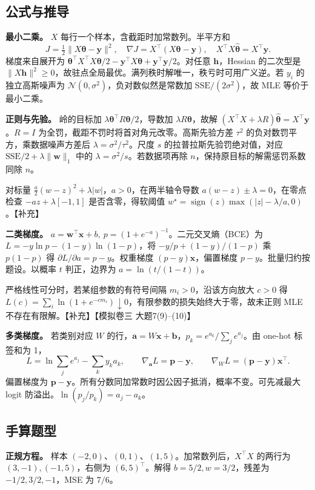 \documentclass[UTF8,a4paper,zihao=-4,fontset=fandol]{ctexart}
\begin{document}
\subsection{公式与推导}
\textbf{最小二乘。} \(X\) 每行一个样本，含截距时加常数列。半平方和
\[
 J=\tfrac12\|X\bm\theta-\bm y\|^2,\quad
 \nabla J=X^\top(X\bm\theta-\bm y),\quad X^\top X\widehat{\bm\theta}=X^\top\bm y .
\]
梯度来自展开为 \(\bm\theta^\top X^\top X\bm\theta/2-\bm y^\top X\bm\theta+\bm y^\top\bm y/2\)。对任意 \(\bm h\)，Hessian 的二次型是 \(\|X\bm h\|^2\ge0\)，故驻点全局最优。满列秩时解唯一，秩亏时可用广义逆。若 \(y_i\) 的独立高斯噪声为 \(\mathcal N(0,\sigma^2)\)，负对数似然是常数加 \(\mathrm{SSE}/(2\sigma^2)\)，故 MLE 等价于最小二乘。
 
\textbf{正则与先验。} 岭的目标加 \(\lambda\bm\theta^\top R\bm\theta/2\)，导数加 \(\lambda R\bm\theta\)，故解 \((X^\top X+\lambda R)\widehat{\bm\theta}=X^\top\bm y\)。\(R=I\) 为全罚，截距不罚时将首对角元改零。高斯先验方差 \(\tau^2\) 的负对数罚平方，乘数据噪声方差后 \(\lambda=\sigma^2/\tau^2\)。尺度 \(s\) 的拉普拉斯先验罚绝对值，对应 \(\mathrm{SSE}/2+\lambda\|\bm w\|_1\) 中的 \(\lambda=\sigma^2/s\)。若数据项再除 \(n\)，保持原目标的解需惩罚系数同除 \(n\)。
 
对标量 \(\tfrac a2(w-z)^2+\lambda|w|\)，\(a>0\)，在两半轴令导数 \(a(w-z)\pm\lambda=0\)，在零点检查 \(-az+\lambda[-1,1]\) 是否含零，得软阈值 \(w^\star=\operatorname{sign}(z)\max(|z|-\lambda/a,0)\)。【补充】
 
\textbf{二类梯度。} \(a=\bm w^\top\bm x+b,\ p=(1+e^{-a})^{-1}\)。二元交叉熵（BCE）为 \(L=-y\ln p-(1-y)\ln(1-p)\)，将 \(-y/p+(1-y)/(1-p)\) 乘 \(p(1-p)\) 得 \(\partial L/\partial a=p-y\)。权重梯度 \((p-y)\bm x\)，偏置梯度 \(p-y\)。批量归约按题设。以概率 \(t\) 判正，边界为 \(a=\ln(t/(1-t))\)。
 
严格线性可分时，若某组参数的有符号间隔 \(m_i>0\)，沿该方向放大 \(c>0\) 得 \(L(c)=\sum_i\ln(1+e^{-cm_i})\downarrow0\)，有限参数的损失始终大于零，故未正则 MLE 不存在有限解。【补充】【模拟卷三 大题7(9)--(10)】
 
\textbf{多类梯度。} 若类别对应 \(W\) 的行，\(\bm a=W\bm x+\bm b\)，\(p_k=e^{a_k}/\sum_j e^{a_j}\)。由 one-hot 标签和为 1，
\[
 L=\ln\sum_j e^{a_j}-\sum_k y_ka_k,\qquad
 \nabla_{\bm a} L=\bm p-\bm y,\qquad \nabla_W L=(\bm p-\bm y)\bm x^\top .
\]
偏置梯度为 \(\bm p-\bm y\)。所有分数同加常数时因公因子抵消，概率不变。可先减最大 logit 防溢出。\(\ln(p_j/p_k)=a_j-a_k\)。

\subsection{手算题型}
\textbf{正规方程。} 样本 \((-2,0)\)、\((0,1)\)、\((1,5)\)。加常数列后，\(X^\top X\) 的两行为 \((3,-1),(-1,5)\)，右侧为 \((6,5)^\top\)。解得 \(b=5/2,w=3/2\)，残差为 \(-1/2,3/2,-1\)，MSE 为 \(7/6\)。
 
\end{document}
